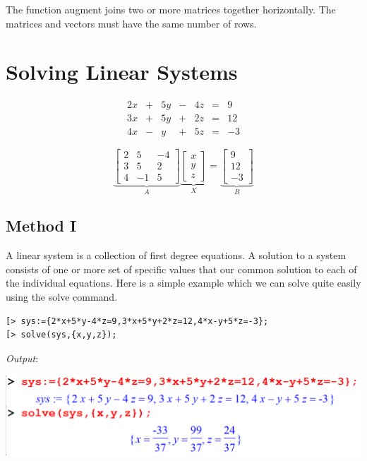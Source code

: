 \documentclass[
]{book}
\theoremstyle{definition}
\theoremstyle{definition}
\theoremstyle{definition}
\theoremstyle{definition}
\theoremstyle{remark}
\begin{document}
The function augment joins two or more matrices together horizontally.
The matrices and vectors must have the same number of rows.

\section{Solving Linear Systems}\label{solving-linear-systems}

\[ \begin{array}{ccccccc} 
2x &+& 5y &-& 4z &=& 9 \\
3x &+& 5y &+& 2z &=& 12 \\
4x &-& y  &+& 5z &=& -3 
\end{array} \]

\[
\underbrace{\begin{bmatrix}
2 & 5 & -4 \\
3 & 5 & 2   \\
4 & -1 & 5  
\end{bmatrix}}_A
\underbrace{\begin{bmatrix}
x \\ y\\z
\end{bmatrix}}_X
=
\underbrace{\begin{bmatrix}
9\\12\\-3
\end{bmatrix}}_B
\]

\subsection{Method I}\label{method-i}

A linear system is a collection of first degree equations.
A solution to a system consists of one or more set of specific values that our common solution to each of the individual equations.
Here is a simple example which we can solve quite easily using the solve command.

\begin{verbatim}
[> sys:={2*x+5*y-4*z=9,3*x+5*y+2*z=12,4*x-y+5*z=-3};
[> solve(sys,{x,y,z});
\end{verbatim}

\emph{Output}:

\includegraphics{figures/Lesson 5/fig4.png}
\end{document}
